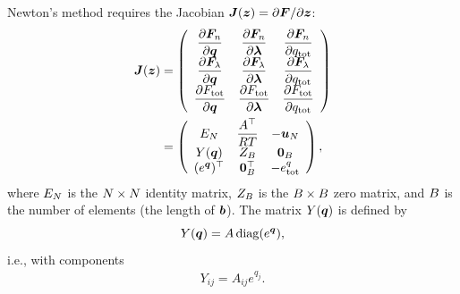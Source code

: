 Newton’s method requires the Jacobian $\boldsymbol{J} (\boldsymbol{z}) = \partial \boldsymbol{F} / \partial \boldsymbol{z}$:
\begin{align}
\label{eq:jacobian_tce}
\boldsymbol{J} (\boldsymbol{z}) &=
\left(
\begin{array}{ccc}
    \dfrac{\partial \boldsymbol{F}_n}{\partial \boldsymbol{q}}  & \dfrac{\partial \boldsymbol{F}_n}{\partial \boldsymbol{\lambda}}& \dfrac{\partial \boldsymbol{F}_n}{\partial q_\mathrm{tot}}\\ 
    \dfrac{\partial \boldsymbol{F}_\lambda}{\partial \boldsymbol{q}} & \dfrac{\partial \boldsymbol{F}_\lambda}{\partial \boldsymbol{\lambda}} & \dfrac{\partial \boldsymbol{F}_\lambda}{\partial q_\mathrm{tot}} \\
    \dfrac{\partial F_\mathrm{tot}}{\partial \boldsymbol{q}} & \dfrac{\partial F_\mathrm{tot}}{\partial \boldsymbol{\lambda}} & \dfrac{\partial F_\mathrm{tot}}{\partial q_\mathrm{tot}} \\  
\end{array}
\right) \nonumber \\
&=
\left(
\begin{array}{ccc}
 E_N &  \dfrac{A^\top}{RT} & - \boldsymbol{u}_N\\ 
 Y({\boldsymbol{q}}) & Z_B & \boldsymbol{0}_B \\ 
 (e^{\boldsymbol{q}})^\top & \boldsymbol{0}_B^\top & - e^q_\mathrm{tot}\\  
\end{array}
\right),
\end{align}
where $E_N$ is the $N \times N$ identity matrix, $Z_B$ is the $B \times B$ zero matrix, and $B$ is the number of elements (the length of $\boldsymbol{b}$). The matrix $Y(\boldsymbol{q})$ is defined by
\[
Y(\boldsymbol{q})= A \, \mathrm{diag}(e^{\boldsymbol{q}}),
\]
i.e., with components
\begin{align}
Y_{ij} = A_{ij} e^{q_j}.
\end{align}

